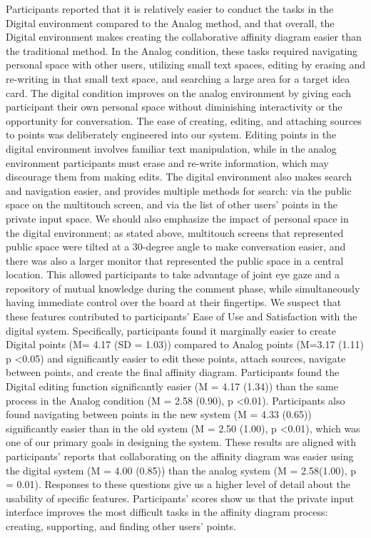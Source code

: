 \documentclass{sigchi}
\begin{document}
Participants reported that it is relatively easier to conduct the tasks in the Digital environment compared to the Analog method, and that overall, the Digital environment makes creating the collaborative affinity diagram easier than the traditional method. In the Analog condition, these tasks required navigating personal space with other users, utilizing small text spaces, editing by erasing and re-writing in that small text space, and searching a large area for a target idea card. The digital condition improves on the analog environment by giving each participant their own personal space without diminishing interactivity or the opportunity for conversation. The ease of creating, editing, and attaching sources to points was deliberately engineered into our system. Editing points in the digital environment involves familiar text manipulation, while in the analog environment participants must erase and re-write information, which may discourage them from making edits. The digital environment also makes search and navigation easier, and provides multiple methods for search: via the public space on the multitouch screen, and via the list of other users' points in the private input space. We should also emphasize the impact of personal space in the digital environment; as stated above, multitouch screens that represented public space were tilted at a 30-degree angle to make conversation easier, and there was also a larger monitor that represented the public space in a central location. This allowed participants to take advantage of joint eye gaze and a repository of mutual knowledge during the comment phase, while simultaneously having immediate control over the board at their fingertips. We suspect that these features contributed to participants' Ease of Use and Satisfaction with the digital system. Specifically, participants found it marginally easier to create Digital points (M= 4.17 (SD = 1.03)) compared to Analog points (M=3.17 (1.11) p \textless 0.05) and significantly easier to edit these points, attach sources, navigate between points, and create the final affinity diagram.  Participants found the Digital editing function significantly easier (M = 4.17 (1.34)) than the same process in the Analog condition (M = 2.58 (0.90), p \textless 0.01). Participants also found navigating between points in the new system (M = 4.33 (0.65)) significantly easier than in the old system (M = 2.50 (1.00), p \textless 0.01), which was one of our primary goals in designing the system. These results are aligned with participants' reports that collaborating on the affinity diagram was easier using the digital system (M = 4.00 (0.85)) than the analog system (M = 2.58(1.00), p = 0.01). Responses to these questions give us a higher level of detail about the usability of specific features. Participants' scores show us that the private input interface improves the most difficult tasks in the affinity diagram process: creating, supporting, and finding other users' points. 
\end{document}
